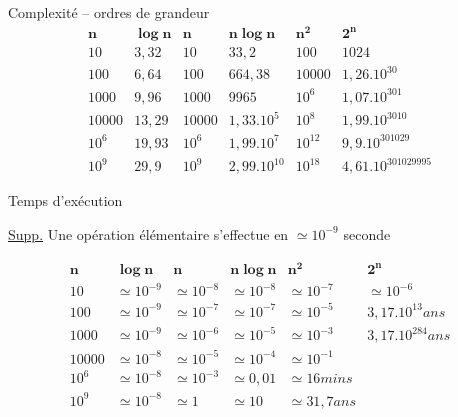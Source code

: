 \begin{frame}{Complexité -- ordres de grandeur}
  $$
  \begin{array}{l|lllll}
    \mathbf{n} & \mathbf{\log{n}} & \mathbf{n} & \mathbf{n\log{n}} & \mathbf{n^2} &  \mathbf{2^n} \\
    \hline
    10         &   3,32      & 10  & 33,2             & 100  & 1024  \\
    100         &  6,64       & 100  &   664,38       & 10000 &
    1,26.10^{30} \\
    1000         & 9,96        & 1000  &     9965     & 10^6  &
    1,07.10^{301} \\
    10000         & 13,29        & 10000  & 1,33.10^5 & 10^8  &
    1,99.10^{3010} \\
    10^6         &  19,93       & 10^6  &  1,99.10^7  & 10^{12} &
    9,9.10^{301029} \\
    10^9         &  29,9       & 10^9  &  2,99.10^{10}  & 10^{18}    & 4,61.10^{301029995}  
  \end{array}
$$
\end{frame}

\begin{frame}{Temps d'exécution}
  
  \underline{Supp.} Une opération élémentaire s'effectue en  $\simeq 10^{-9}$
  seconde

$$
\begin{array}{l|lllll}
    \mathbf{n} & \mathbf{\log{n}} & \mathbf{n} & \mathbf{n\log{n}} & \mathbf{n^2} &  \mathbf{2^n} \\
    \hline
    10         & \simeq 10^{-9}      & \simeq 10^{-8}  & \simeq 10^{-8} & \simeq 10^{-7}  & \simeq 10^{-6}  \\
    100        & \simeq  10^{-9}     & \simeq 10^{-7}  & \simeq 10^{-7} & \simeq 10^{-5} &    3,17.10^{13} ans \\
    1000       & \simeq 10^{-9}     & \simeq 10^{-6}  & \simeq 10^{-5}     & \simeq 10^{-3} & 3,17.10^{284} ans  \\
    10000      & \simeq  10^{-8}      & \simeq 10^{-5}  & \simeq 10^{-4} & \simeq 10^{-1}  &    \\
    10^6         & \simeq 10^{-8}     & \simeq 10^{-3}  & \simeq 0,01      & \simeq 16 mins &     \\
    10^9         & \simeq  10^{-8}     & \simeq 1  & \simeq 10      & \simeq 31,7 ans    & 
  \end{array}
$$ 
\end{frame}

